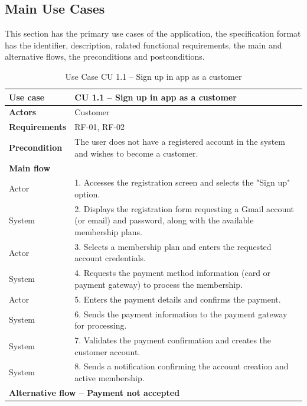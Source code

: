\documentclass{article}
\begin{document}
\subsection{Main Use Cases}
This section has the primary use cases of the application, the specification format has the identifier, description, ralated functional requirements, the main and alternative flows, the preconditions and postconditions.   


\begin{table}[H]
\centering
\small
\renewcommand{\arraystretch}{1.35}
\caption{Use Case CU 1.1 -- Sign up in app as a customer}
\label{tab:cu1.1}
\begin{tabularx}{\textwidth}{|l|X|}
\hline
\textbf{Use case} & CU 1.1 -- Sign up in app as a customer \\ \hline
\textbf{Actors} & Customer \\ \hline
\textbf{Requirements} & RF-01, RF-02 \\ \hline
\textbf{Precondition} & The user does not have a registered account in the system and wishes to become a customer. \\ \hline
\multicolumn{2}{|l|}{\textbf{Main flow}} \\ \hline
Actor & 1. Accesses the registration screen and selects the "Sign up" option. \\ \hline
System & 2. Displays the registration form requesting a Gmail account (or email) and password, along with the available membership plans. \\ \hline
Actor & 3. Selects a membership plan and enters the requested account credentials. \\ \hline
System & 4. Requests the payment method information (card or payment gateway) to process the membership. \\ \hline
Actor & 5. Enters the payment details and confirms the payment. \\ \hline
System & 6. Sends the payment information to the payment gateway for processing. \\ \hline
System & 7. Validates the payment confirmation and creates the customer account. \\ \hline
System & 8. Sends a notification confirming the account creation and active membership. \\ \hline
\multicolumn{2}{|l|}{\textbf{Alternative flow -- Payment not accepted}} \\ \hline

\end{tabularx}
\end{table}
\end{document}
